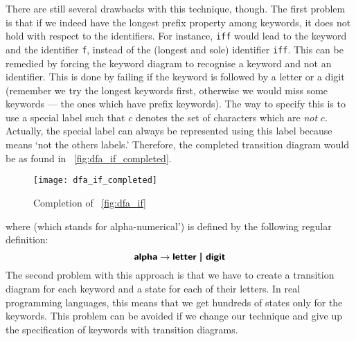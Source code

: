 There are still several drawbacks with this technique, though. The
first problem is that if we indeed have the longest prefix property
among keywords, it does not hold with respect to the identifiers. For
instance, \texttt{iff} would lead to the keyword  and the
identifier \texttt{f}, instead of the (longest and sole) identifier
\texttt{iff}. This can be remedied by forcing the keyword diagram to
recognise a keyword and not an identifier. This is done by failing if
the keyword is followed by a letter or a digit (remember we try the
longest keywords first, otherwise we would miss some keywords --- the
ones which have prefix keywords). The way to specify this is to use a
special label \compl such that \compl \(c\) denotes the set of
characters which are \emph{not} \(c\). Actually, the special label
\other can always be represented using this \compl label because
\other means `not the others labels.' Therefore, the completed
 transition diagram would be as found in
\fig~\vref{fig:dfa_if_completed}.
\begin{figure}
\centering
\texttt{[image: dfa\_if\_completed]}
\caption{Completion of \fig~\vref{fig:dfa_if}
\label{fig:dfa_if_completed}}
\end{figure}
where  (which stands for alpha-numerical') is defined by
the following regular definition:
\begin{equation*}
\term{alpha} \rightarrow \text{\term{letter} \disj \term{digit}}
\end{equation*}
The second problem with this approach is that we have to create a
transition diagram for each keyword and a state for each of their
letters. In real programming languages, this means that we get
hundreds of states only for the keywords. This problem can be avoided
if we change our technique and give up the specification of keywords
with transition diagrams.

